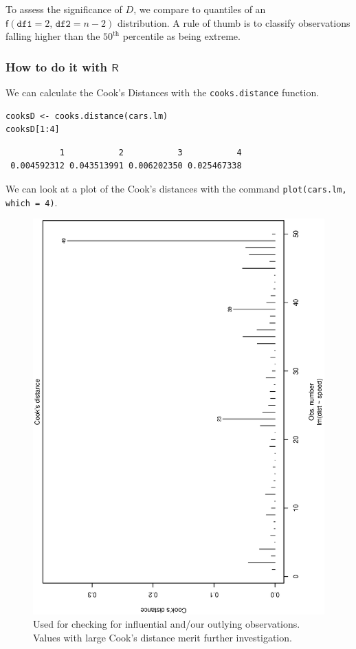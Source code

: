 \documentclass[captions=tableheading]{scrbook}
\begin{document}
To assess the significance of \(D\), we compare to quantiles of an \(\mathsf{f}(\mathtt{df1}=2,\,\mathtt{df2}=n-2)\) distribution. A rule of thumb is to classify observations falling higher than the \(50^{\mathrm{th}}\) percentile as being extreme. 
\subsubsection{How to do it with \(\mathsf{R}\)}
\label{sec-11-5-4-3}


We can calculate the Cook's Distances with the \texttt{cooks.distance} function.


\begin{verbatim}
cooksD <- cooks.distance(cars.lm)
cooksD[1:4]
\end{verbatim}

\begin{verbatim}
           1           2           3           4 
 0.004592312 0.043513991 0.006202350 0.025467338
\end{verbatim}

We can look at a plot of the Cook's distances with the command \texttt{plot(cars.lm, which = 4)}.

\begin{figure}[th]
  \includegraphics[angle=270, totalheight=4in]{ps/slr/Cooks-distance-cars.ps}
  \caption[Cook's distances for the \texttt{cars} data]{\small Used for checking for influential and/our outlying observations. Values with large Cook's distance merit further investigation.}
  \label{fig-Cooks-distance-cars}
\end{figure}
\end{document}
